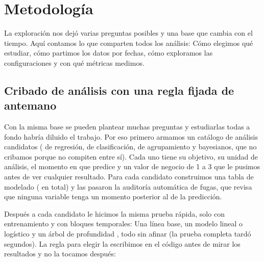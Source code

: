 \section{Metodología}
\label{sec:metodologia}

La exploración nos dejó varias preguntas posibles y una base que cambia con
el tiempo. Aquí contamos lo que comparten todos los análisis: Cómo elegimos
qué estudiar, cómo partimos los datos por fechas, cómo exploramos las
configuraciones y con qué métricas medimos.

\subsection{Cribado de análisis con una regla fijada de antemano}
\label{sec:cribado}

Con la misma base se pueden plantear muchas preguntas y estudiarlas todas a
fondo habría diluido el trabajo. Por eso primero armamos un catálogo de
\CriCandidatos{} análisis candidatos (\CriCandidatosReg{} de regresión,
\CriCandidatosClf{} de clasificación, \CriCandidatosAgr{} de agrupamiento y
\CriCandidatosBayes{} bayesianos, que no cribamos porque no compiten entre
sí). Cada uno tiene su objetivo, su unidad de análisis, el momento en que
predice y un valor de negocio de 1 a 3 que le pusimos antes de ver cualquier
resultado. Para cada candidato construimos una tabla de modelado
(\CriTablasConstruidas{} en total) y las \CriAuditoriasSuperadas{} pasaron la
auditoría automática de fugas, que revisa que ninguna variable tenga un
momento posterior al de la predicción.

Después a cada candidato le hicimos la misma prueba rápida, solo con
entrenamiento y con \DatBloquesCV{} bloques temporales: Una línea base, un
modelo lineal o logístico y un árbol de profundidad \CriProfundidadArbol{},
todo sin afinar (la prueba completa tardó \CriSegundosPrueba{} segundos). La
regla para elegir la escribimos en el código antes de mirar los resultados y
no la tocamos después:

